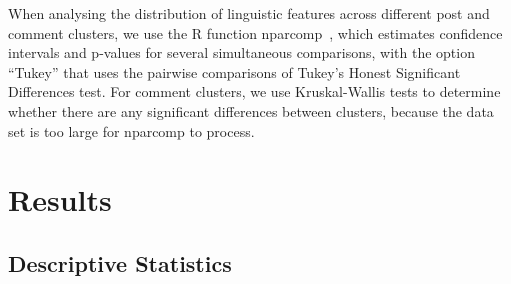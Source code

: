 When analysing the distribution of linguistic features across different post and comment clusters, we use the R function nparcomp~\cite{nparcomp}, which estimates confidence intervals and p-values for several simultaneous comparisons, with the option ``Tukey'' that uses the pairwise comparisons of Tukey's Honest Significant Differences test. For comment clusters, we use Kruskal-Wallis tests to determine whether there are any significant differences between clusters, because the data set is too large for nparcomp to process.










\section{Results}

\subsection{Descriptive Statistics}


